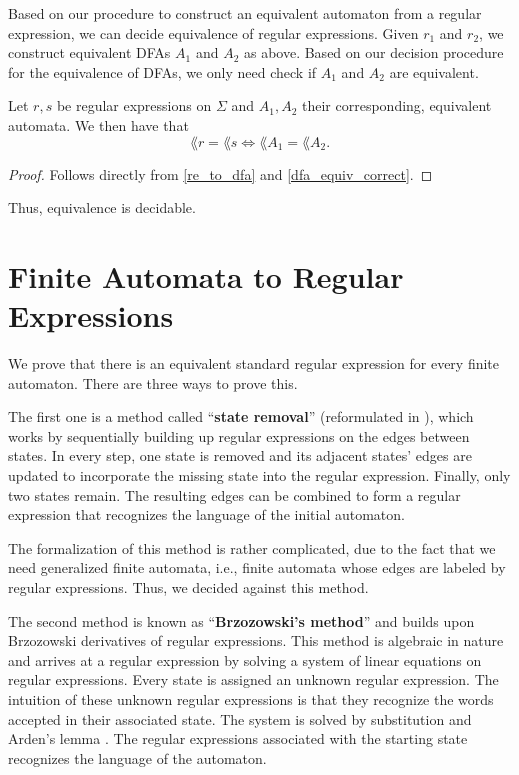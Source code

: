  
Based on our procedure to construct an equivalent automaton from a regular expression, we can decide equivalence of regular expressions. Given $r_1$ and $r_2$, we construct equivalent DFAs $A_1$ and $A_2$ as above.
Based on our decision procedure for the equivalence of DFAs, we only need check if $A_1$ and $A_2$ are equivalent.

\begin{theorem} 
    \label{re_equiv_correct}
    Let $r, s$ be regular expressions on $\Sigma$ and $A_1, A_2$ their corresponding, equivalent automata. 
    We then have that
    \begin{equation*}
        \lang{r} = \lang{s} \iff \lang{A_1} = \lang{A_2}.
    \end{equation*}
\end{theorem}
\begin{proof}
    Follows directly from \ref{re_to_dfa} and \ref{dfa_equiv_correct}.
\end{proof}

Thus, equivalence is decidable.


\section{Finite Automata to Regular Expressions}
We prove that there is an equivalent standard regular expression for every finite automaton.
There are three ways to prove this. 


The first one is a method called ``\textbf{state removal}'' \cite{SignalFlow} (reformulated in \cite{springerlink:10.1007/978-3-540-30500-2}),
which works by sequentially building up regular expressions on the edges between states. 
In every step, one state is removed and its adjacent states' edges are updated to incorporate the missing state into the regular expression.
Finally, only two states remain. The resulting edges can be combined to form a regular expression that recognizes the language of the initial automaton.

The formalization of this method is rather complicated, due to the fact that we need generalized finite automata, i.e., 
finite automata whose edges are labeled by regular expressions. 
Thus, we decided against this method.


The second method is known as ``\textbf{Brzozowski's method}'' \cite{DBLP:journals/jacm/Brzozowski64} and builds upon Brzozowski derivatives of regular expressions.
This method is algebraic in nature and arrives at a regular expression by solving a system of linear equations on regular expressions. 
Every state is assigned an unknown regular expression. 
The intuition of these unknown regular expressions is that they recognize the words accepted in their associated state. 
The system is solved by substitution and Arden's lemma \cite{DBLP:conf/focs/Arden61}.
The regular expressions associated with the starting state recognizes the language of the automaton.

